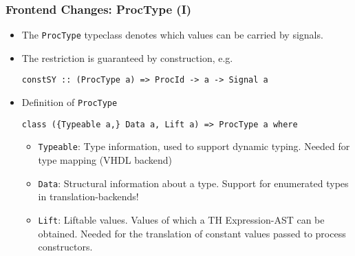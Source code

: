 \documentclass{beamer}
\begin{document}
\begin{frame}[fragile]
  \frametitle{Frontend Changes:  ProcType (I)}
  \begin{itemize}
  \item<1-> The \texttt{ProcType} typeclass denotes which values can be
    carried by signals.
  \item<2-> The restriction is guaranteed by construction, e.g.
\begin{lstlisting}
constSY :: (ProcType a) => ProcId -> a -> Signal a
\end{lstlisting}    
  \item<3-> Definition of \texttt{ProcType}
\begin{lstlisting}
class ({Typeable a,} Data a, Lift a) => ProcType a where
\end{lstlisting}
    \begin{itemize}
      \item \texttt{Typeable}: Type information, used to support
        dynamic typing. Needed for type mapping (VHDL backend)
      \item \texttt{Data}: Structural information about a type. 
        \alert{Support for enumerated types in translation-backends!}
      \item \texttt{Lift}: Liftable values. Values of which a TH
        Expression-AST can be obtained. Needed for the translation of
        constant values passed to process constructors.
    \end{itemize}
  \end{itemize}
\end{frame}
\end{document}
